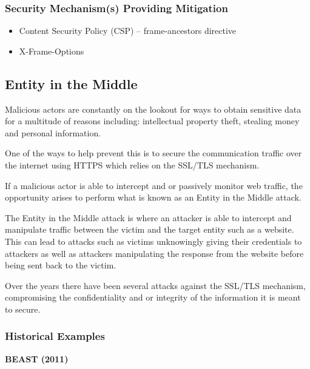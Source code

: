 \documentclass{mscreport}
\begin{document}
\subsubsection{Security Mechanism(s) Providing Mitigation}

\begin{itemize}
	\setlength\itemsep{0.1em}
	\item Content Security Policy (CSP) – frame-ancestors directive
	\item X-Frame-Options
\end{itemize}

\subsection{Entity in the Middle}
\label{subsection:entity_in_the_middle}

Malicious actors are constantly on the lookout for ways to obtain sensitive data for a multitude of reasons including: intellectual property theft, stealing money and personal information.

\vspace{0.3cm} \noindent
One of the ways to help prevent this is to secure the communication traffic over the internet using HTTPS which relies on the SSL/TLS mechanism.

\vspace{0.3cm} \noindent
If a malicious actor is able to intercept and or passively monitor web traffic, the opportunity arises to perform what is known as an Entity in the Middle attack.

\vspace{0.3cm} \noindent
The Entity in the Middle attack is where an attacker is able to intercept and manipulate traffic between the victim and the target entity such as a website. This can lead to attacks such as victims unknowingly giving their credentials to attackers as well as attackers manipulating the response from the website before being sent back to the victim.

\vspace{0.3cm} \noindent
Over the years there have been several attacks against the SSL/TLS mechanism, compromising the confidentiality and or integrity of the information it is meant to secure.

\subsubsection{Historical Examples}
\textbf{BEAST (2011)}
\end{document}
